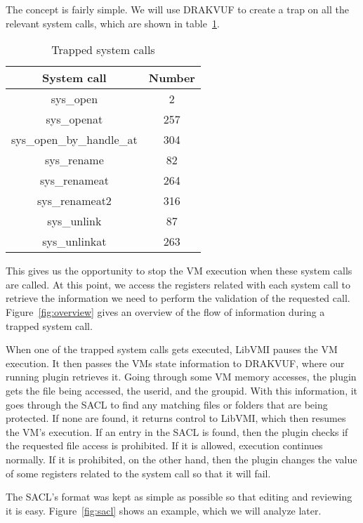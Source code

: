 \par The concept is fairly simple. We will use DRAKVUF to create a trap on all the relevant system calls, which are shown in table~\ref{tbl:syscalls}.

\begin{table}[ht]
	\centering
	\caption{Trapped system calls}
	\label{tbl:syscalls}
	\begin{tabular}{cc}
		\toprule
		System call & Number \\
		\hline
		sys\_open & 2 \\ sys\_openat & 257 \\ sys\_open\_by\_handle\_at & 304 \\
		sys\_rename & 82 \\ sys\_renameat & 264 \\  sys\_renameat2 & 316 \\ 
		sys\_unlink & 87 \\ sys\_unlinkat & 263 \\
		\bottomrule
\end{tabular}	
\end{table}

This gives us the opportunity to stop the \ac{VM} execution when these system calls are called. At this point, we access the registers related with each system call to retrieve the information we need to perform the validation of the requested call. Figure~\ref{fig:overview} gives an overview of the flow of information during a trapped system call. 

\par When one of the trapped system calls gets executed, LibVMI pauses the \ac{VM} execution. It then passes the \ac{VM}s state information to DRAKVUF, where our running plugin retrieves it. Going through some \ac{VM} memory accesses, the plugin gets the file being accessed, the userid, and the groupid. With this information, it goes through the \ac{SACL} to find any matching files or folders that are being protected. If none are found, it returns control to LibVMI, which then resumes the \ac{VM}'s execution. If an entry in the \ac{SACL} is found, then the plugin checks if the requested file access is prohibited. If it is allowed, execution continues normally. If it is prohibited, on the other hand, then the plugin changes the value of some registers related to the system call so that it will fail.

\par The \ac{SACL}'s format was kept as simple as possible so that editing and reviewing it is easy. Figure~\ref{fig:sacl} shows an example, which we will analyze later.

